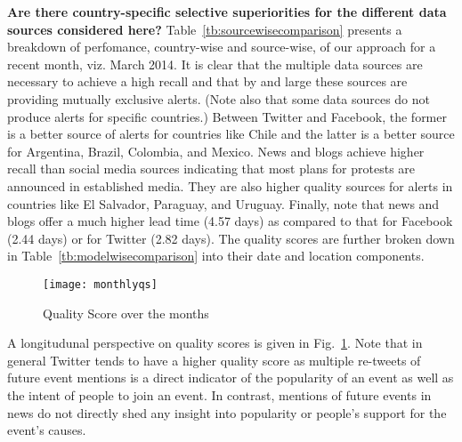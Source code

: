 \noindent
{\bf Are there country-specific selective superiorities for the different data sources considered here?}
Table~\ref{tb:sourcewisecomparison} presents a breakdown of perfomance, country-wise and source-wise, of 
our approach for a recent month, viz. March 2014.
It is clear that the multiple data sources are necessary to achieve a high recall and that by and large
these sources are providing mutually exclusive alerts. (Note also that some data sources do not produce alerts for specific
countries.) Between Twitter and Facebook, the former is a better
source of alerts for countries like Chile and the latter is a better source for Argentina, Brazil, Colombia, and Mexico.
News and blogs achieve higher recall than social media sources indicating that most plans for protests are announced
in established media. They are also
higher quality sources for alerts in countries like El Salvador, Paraguay, and Uruguay.
Finally, note that news and blogs offer a much higher lead time (4.57 days) 
as compared to that for Facebook (2.44 days) or for Twitter (2.82 days). The quality scores are
further broken down in Table~\ref{tb:modelwisecomparison} into their date and location components.

\begin{figure}[!ht]
    \vspace{-1em}
    \centering
    \texttt{[image: monthlyqs]}
    \vspace{-.5em}
    \caption{Quality Score over the months}
    \label{fig:monthlyqs}
    \vspace{-1.5em}
\end{figure}
A longitudunal perspective on quality scores is
given in Fig.~\ref{fig:monthlyqs}. Note that in general Twitter tends to have a higher quality score
as multiple re-tweets of future event mentions is a direct indicator of the popularity of an event as 
well as the intent of people to join an event. 
In contrast, mentions of future events in news do not directly shed any insight into popularity or people's
support for the event's causes.\\

